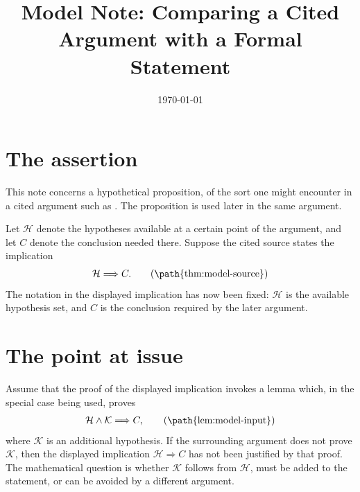 \documentclass[11pt]{article}
\title{Model Note: Comparing a Cited Argument with a Formal Statement}
\author{}
\date{\today}
\begin{document}
\maketitle
{}


\section{The assertion}

This note concerns a hypothetical proposition, of the sort one might encounter
in a cited argument such as \cite{ModelSource}.  The proposition is used
later in the same argument.

Let \(\mathcal H\) denote the hypotheses available at a certain point of the
argument, and let \(C\) denote the conclusion needed there.  Suppose the cited
source states the implication
\begin{align}
  \mathcal H \Longrightarrow C.
  \tag{\path{thm:model-source}}
\end{align}
The notation in the displayed implication has now been fixed: \(\mathcal H\) is
the available hypothesis set, and \(C\) is the conclusion required by the later
argument.

\section{The point at issue}

Assume that the proof of the displayed implication invokes a lemma which, in the
special case being used, proves
\begin{align}
  \mathcal H \wedge \mathcal K \Longrightarrow C,
  \tag{\path{lem:model-input}}
\end{align}
where \(\mathcal K\) is an additional hypothesis.  If the surrounding argument
does not prove \(\mathcal K\), then the displayed implication
\(\mathcal H\Rightarrow C\) has not been justified by that proof.  The
mathematical question is whether \(\mathcal K\) follows from \(\mathcal H\), must
be added to the statement, or can be avoided by a different argument.
\end{document}
